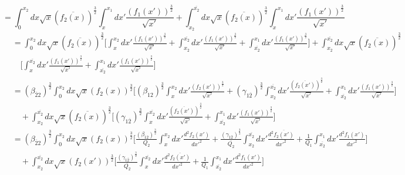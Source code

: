 \documentclass[fleqn, 10pt]{article}
\begin{document}
                \begin{equation*}
                    = \int^{x_2}_0 dx \sqrt{x} (\overline{f_{2}(x)})^\frac{3}{2} \int^{x_1}_{x} dx' \frac{(f_1(x'))^\frac{3}{2}}{\sqrt{x'}} + \int^{\overline{x_{2}}}_{x_2} dx \sqrt{x} (\overline{f_{2}(x)})^\frac{3}{2} \int^{x_1}_{x} dx' \frac{(f_1(x'))^\frac{3}{2}}{\sqrt{x'}}
                \end{equation*}
                \begin{equation*}
                \begin{split}
                    &= \int^{x_2}_0 dx \sqrt{x} (\overline{f_{2}(x)})^\frac{3}{2} \Biggl[ \int^{x_2}_{x} dx' \frac{(f_1(x'))^\frac{3}{2}}{\sqrt{x'}} + \int^{\overline{x_{2}}}_{x_2} dx' \frac{(f_1(x'))^\frac{3}{2}}{\sqrt{x'}} + \int^{x_1}_{\overline{x_{2}}} dx' \frac{(f_1(x'))^\frac{3}{2}}{\sqrt{x'}} \Biggr] + \int^{\overline{x_{2}}}_{x_2} dx \sqrt{x} (\overline{f_{2}(x)})^\frac{3}{2} \\ & \quad \Biggl[ \int^{\overline{x_{2}}}_{x} dx' \frac{(f_1(x'))^\frac{3}{2}}{\sqrt{x'}}  + \int^{x_1}_{\overline{x_{2}}} dx' \frac{(f_1(x'))^\frac{3}{2}}{\sqrt{x'}} \Biggr]
                    \end{split}
                \end{equation*}
                \begin{equation*}
                \begin{split}
                    &= (\beta_{\overline{2}2})^\frac{3}{2} \int^{x_2}_0 dx \sqrt{x} (f_2(x))^\frac{3}{2} \Biggl[ (\beta_{12})^\frac{3}{2} \int^{x_2}_{x} dx' \frac{(f_2(x'))^\frac{3}{2}}{\sqrt{x'}} + (\gamma_{1\overline{2}})^\frac{3}{2} \int^{\overline{x_{2}}}_{x_2} dx' \frac{(\overline{f_2(x')})^\frac{3}{2}}{\sqrt{x'}} + \int^{x_1}_{\overline{x_{2}}} dx' \frac{(f_1(x'))^\frac{3}{2}}{\sqrt{x'}} \Biggr] \\ & \quad + \int^{\overline{x_{2}}}_{x_2} dx \sqrt{x} (\overline{f_{2}(x)})^\frac{3}{2}  \Biggl[ (\gamma_{1\overline{2}})^\frac{3}{2} \int^{\overline{x_{2}}}_{x} dx' \frac{(\overline{f_2(x')})^\frac{3}{2}}{\sqrt{x'}} + \int^{x_1}_{\overline{x_{2}}} dx' \frac{(f_1(x'))^\frac{3}{2}}{\sqrt{x'}} \Biggr]
                    \end{split}
                \end{equation*}
                \begin{equation*}
                \begin{split}
                    &= (\beta_{\overline{2}2})^\frac{3}{2} \int^{x_2}_0 dx \sqrt{x} (f_2(x))^\frac{3}{2} \Biggl[\frac{(\beta_{12})^\frac{3}{2}}{Q_2} \int^{x_2}_{x} dx' \frac{d^2f_2(x')}{dx'^2} + \frac{(\gamma_{1\overline{2}})^\frac{3}{2}}{\overline{Q_{2}}} \int^{\overline{x_{2}}}_{x_2} dx' \frac{d^2\overline{f_2(x')}}{dx'^2} + \frac{1}{Q_1} \int^{x_1}_{\overline{x_{2}}} dx' \frac{d^2f_1(x')}{dx'^2} \Biggr] \\ & \quad + \int^{\overline{x_{2}}}_{x_2} dx \sqrt{x} (f_2(x'))^\frac{3}{2} \Biggl[ \frac{(\gamma_{1\overline{2}})^\frac{3}{2}}{\overline{Q_{2}}} \int^{\overline{x_{2}}}_{x} dx' \frac{d^2\overline{f_2(x')}}{dx'^2} + \frac{1}{Q_1} \int^{x_1}_{\overline{x_{2}}} dx' \frac{d^2f_1(x')}{dx'^2} \biggr] 
                    \end{split}
                \end{equation*}
\end{document}
